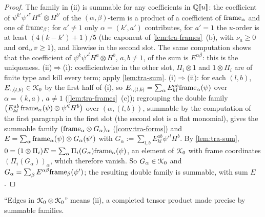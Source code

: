 \begin{proof}
The family in (ii) is summable for any coefficients in $\mathbb{Q}[\![ u ]\!]$: the coefficient of $\psi^{k'}\psi'^{l'}H^{a'}\otimes H^{b'}$ of the $(\alpha,\beta)$-term is a product of a coefficient of $\mathrm{frame}_\alpha$ and one of $\mathrm{frame}_\beta$; for $a'\neq 1$ only $\alpha = (k',a')$ contributes, for $a' = 1$ the $u$-order is at least $(4(k-k')+1)/5$ (the exponent of \cref{lem:tra-frames}~(b), with $\nu_a\geq0$ and $\operatorname{ord}_uv\geq1$), and likewise in the second slot. The same computation shows that the coefficient of $\psi^k\psi'^lH^a\otimes H^b$, $a,b\neq 1$, of the sum is $E^{\alpha\beta}$: this is the uniqueness.
(ii)$\Rightarrow$(i): coefficientwise in the other slot, $\Pi_i\otimes 1$ and $1\otimes\Pi_i$ are of finite type and kill every term; apply \cref{lem:tra-sum}.
(i)$\Rightarrow$(ii): for each $(l,b)$, $E_{\cdot,(l,b)}\in\mathcal{K}_{0}$ by the first half of (i), so $E_{\cdot,(l,b)} = \sum_\alpha E^{ab}_{kl}\mathrm{frame}_\alpha(\psi)$ over $\alpha = (k,a)$, $a\neq 1$ (\cref{lem:tra-frames}~(c)); regrouping the double family $\bigl(E^{ab}_{kl}\,\mathrm{frame}_\alpha(\psi)\otimes\psi'^lH^b\bigr)$ over $(\alpha,(l,b))$, summable by the computation of the first paragraph in the first slot (the second slot is a flat monomial), gives the summable family $(\mathrm{frame}_\alpha\otimes G_\alpha)_\alpha$ (\cref{conv:tra-forms}) and $E = \sum_\alpha\mathrm{frame}_\alpha(\psi)\otimes G_\alpha(\psi')$ with $G_\alpha := \sum_{l,b}E^{ab}_{kl}\psi'^lH^b$. By \cref{lem:tra-sum}, $0 = (1\otimes\Pi_i)E = \sum_\alpha\Pi_i(G_\alpha)\mathrm{frame}_\alpha(\psi)$, an element of $\mathcal{K}_{0}$ with frame coordinates $(\Pi_i(G_\alpha))_\alpha$, which therefore vanish. So $G_\alpha\in\mathcal{K}_{0}$ and $G_\alpha = \sum_\beta E^{\alpha\beta}\mathrm{frame}_\beta(\psi')$; the resulting double family is summable, with sum $E$.
\end{proof}

``Edges in $\mathcal{K}_{0}\otimes\mathcal{K}_{0}$'' means (ii), a completed tensor product made precise by summable families.


